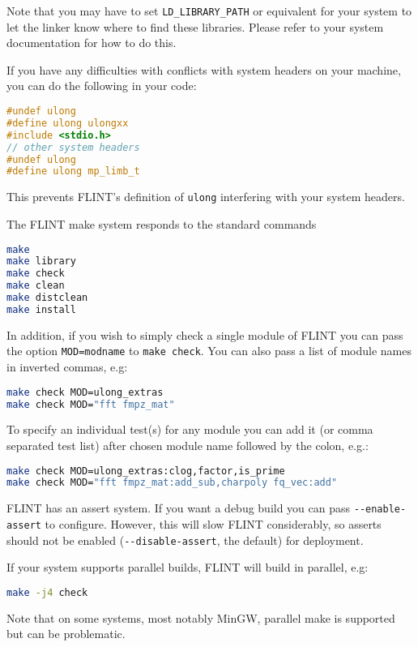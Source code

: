 \documentclass[a4paper,10pt]{book}
\newcommand{\code}{\lstinline}
\begin{document}
Note that you may have to set \code{LD_LIBRARY_PATH} or equivalent
for your system to let the linker know where to find these libraries.
Please refer to your system documentation for how to do this.

If you have any difficulties with conflicts with system headers on
your machine, you can do the following in your code:

\begin{lstlisting}[language=C]
#undef ulong
#define ulong ulongxx
#include <stdio.h>
// other system headers
#undef ulong
#define ulong mp_limb_t
\end{lstlisting}

This prevents FLINT's definition of \code{ulong} interfering with
your system headers.

The FLINT make system responds to the standard commands
\begin{lstlisting}[language=bash]
make
make library
make check
make clean
make distclean
make install
\end{lstlisting}

In addition, if you wish to simply check a single module of FLINT you
can pass the option \code{MOD=modname} to \code{make check}. You can
also pass a list of module names in inverted commas, e.g:

\begin{lstlisting}[language=bash]
make check MOD=ulong_extras
make check MOD="fft fmpz_mat"
\end{lstlisting}

To specify an individual test(s) for any module you can add it 
(or comma separated test list)
after chosen module name followed by the colon, e.g.:

\begin{lstlisting}[language=bash]
make check MOD=ulong_extras:clog,factor,is_prime
make check MOD="fft fmpz_mat:add_sub,charpoly fq_vec:add"
\end{lstlisting}

FLINT has an assert system. If you want a debug build you can pass
\code{--enable-assert} to configure. However, this will slow FLINT
considerably, so asserts should not be enabled (\code{--disable-assert},
the default) for deployment.

If your system supports parallel builds, FLINT will build in parallel,
e.g:
\begin{lstlisting}[language=bash]
make -j4 check
\end{lstlisting}

Note that on some systems, most notably MinGW, parallel make is
supported but can be problematic.
\end{document}
